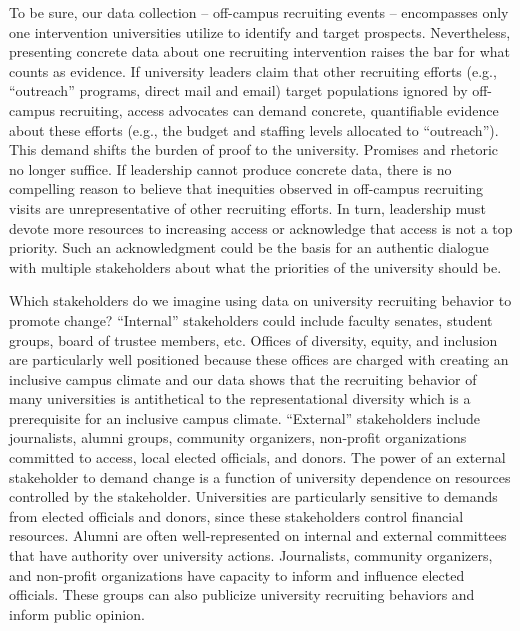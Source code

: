 \documentclass[twoside]{article}
\begin{document}
To be sure, our data collection -- off-campus recruiting events -- encompasses only one intervention universities utilize to identify and target prospects. Nevertheless, presenting concrete data about one recruiting intervention raises the bar for what counts as evidence. If university leaders claim that other recruiting efforts (e.g., ``outreach'' programs, direct mail and email) target populations ignored by off-campus recruiting, access advocates can demand concrete, quantifiable evidence about these efforts (e.g., the budget and staffing levels allocated to ``outreach'').  This demand shifts the burden of proof to the university. Promises and rhetoric no longer suffice. If leadership cannot produce concrete data, there is no compelling reason to believe that inequities observed in off-campus recruiting visits are unrepresentative of other recruiting efforts. In turn, leadership must devote more resources to increasing access or acknowledge that access is not a top priority.  Such an acknowledgment could be the basis for an authentic dialogue with multiple stakeholders about what the priorities of the university should be.

Which stakeholders do we imagine using data on university recruiting behavior to promote change? ``Internal'' stakeholders could include faculty senates, student groups, board of trustee members, etc. Offices of diversity, equity, and inclusion are particularly well positioned because these offices are charged with creating an inclusive campus climate and our data shows that the recruiting behavior of many universities is antithetical to the representational diversity which is a prerequisite for an inclusive campus climate.  ``External'' stakeholders include journalists, alumni groups, community organizers, non-profit organizations committed to access, local elected officials, and donors.  The power of an external stakeholder to demand change is a function of university dependence on resources controlled by the stakeholder. Universities are particularly sensitive to demands from elected officials and donors, since these stakeholders control financial resources.  Alumni are often well-represented on internal and external committees that have authority over university actions.  Journalists, community organizers, and non-profit organizations have capacity to inform and influence elected officials.  These groups can also publicize university recruiting behaviors and inform public opinion.
\end{document}
